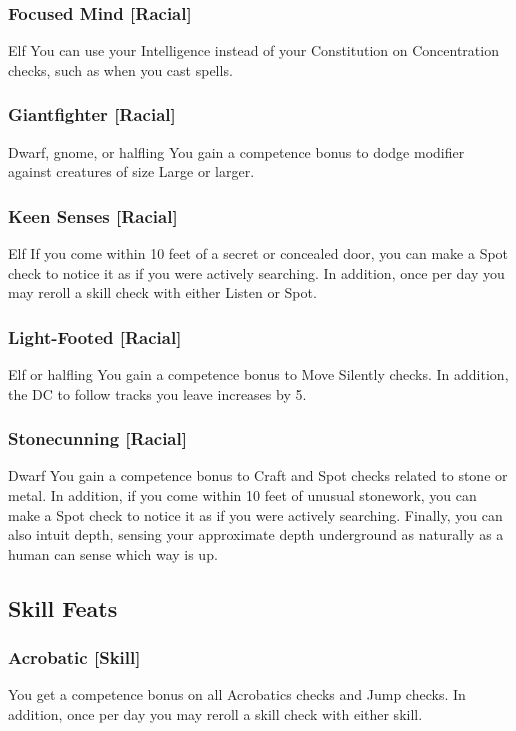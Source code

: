 \subsubsection{Focused Mind [Racial]}
 Elf
 You can use your Intelligence instead of your Constitution on Concentration checks, such as when you cast spells.

\subsubsection{Giantfighter [Racial]}
 Dwarf, gnome, or halfling
 You gain a  competence bonus to dodge modifier against creatures of size Large or larger.

\subsubsection{Keen Senses [Racial]}
 Elf
 If you come within 10 feet of a secret or concealed door, you can make a Spot check to notice it as if you were actively searching. In addition, once per day you may reroll a skill check with either Listen or Spot.

\subsubsection{Light-Footed [Racial]}
 Elf or halfling
 You gain a  competence bonus to Move Silently checks. In addition, the DC to follow tracks you leave increases by 5.

\subsubsection{Stonecunning [Racial]}
 Dwarf
 You gain a  competence bonus to Craft and Spot checks related to stone or metal. In addition, if you come within 10 feet of unusual stonework, you can make a Spot check to notice it as if you were actively searching. Finally, you can also intuit depth, sensing your approximate depth underground as naturally as a human can sense which way is up.

\subsection{Skill Feats}

\subsubsection{Acrobatic [Skill]}
 You get a  competence bonus on all Acrobatics checks and Jump checks. In addition, once per day you may reroll a skill check with either skill.

